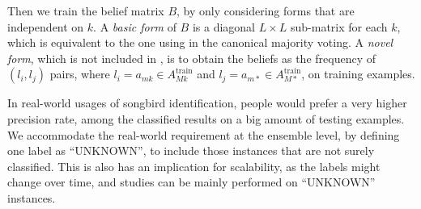 Then we train the belief matrix $B$, by only considering forms that are independent on $k$. A \emph{basic form} of $B$ is a diagonal $L\times L$ sub-matrix for each $k$, which is equivalent to the one using in the canonical majority voting. A \emph{novel form}, which is not included in \cite{rokach2010ensemble}, is to obtain the beliefs as the frequency of $(l_i, l_j)$ pairs, where $l_i=a_{mk} \in A_{Mk}^\text{train}$ and $l_j=a_{m*} \in A_{M*}^\text{train}$, on training examples.

In real-world usages of songbird identification, people would prefer a very higher precision rate, among the classified results on a big amount of testing examples. We accommodate the real-world requirement at the ensemble level, by defining one label as ``UNKNOWN'', to include those instances that are not surely classified. This is also has an implication for scalability, as the labels might change over time, and studies can be mainly performed on ``UNKNOWN'' instances. 







